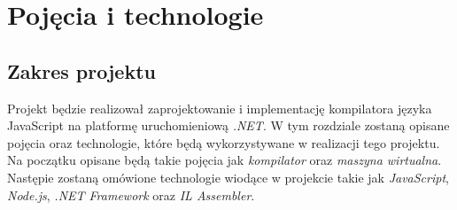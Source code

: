 \chapter{Pojęcia i technologie}
\label{rozdzial1}

\section{Zakres projektu}

Projekt będzie realizował zaprojektowanie i implementację kompilatora języka JavaScript na platformę uruchomieniową \textit{.NET}. W tym rozdziale zostaną opisane pojęcia oraz technologie, które będą wykorzystywane w realizacji tego projektu. Na początku opisane będą takie pojęcia jak \textit{kompilator} oraz \textit{maszyna wirtualna}. Następie zostaną omówione technologie wiodące w projekcie takie jak \textit{JavaScript}, \textit{Node.js}, \textit{.NET Framework} oraz \textit{IL Assembler}.


